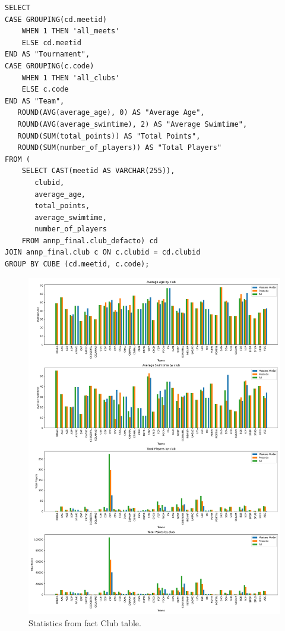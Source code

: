 \begin{verbatim}
SELECT 
CASE GROUPING(cd.meetid)
    WHEN 1 THEN 'all_meets'
    ELSE cd.meetid
END AS "Tournament",
CASE GROUPING(c.code)
    WHEN 1 THEN 'all_clubs'
    ELSE c.code
END AS "Team",
   ROUND(AVG(average_age), 0) AS "Average Age",
   ROUND(AVG(average_swimtime), 2) AS "Average Swimtime",
   ROUND(SUM(total_points)) AS "Total Points",
   ROUND(SUM(number_of_players)) AS "Total Players"
FROM (
    SELECT CAST(meetid AS VARCHAR(255)),
       clubid,
       average_age,
       total_points,
       average_swimtime,
       number_of_players
    FROM annp_final.club_defacto) cd
JOIN annp_final.club c ON c.clubid = cd.clubid
GROUP BY CUBE (cd.meetid, c.code);
\end{verbatim}


\begin{figure}[H]
    \centering
    \includegraphics[width=\textwidth]{img/club_fact1.pdf}
    \caption{Statistics from fact Club table.}
    \label{fig:clubs_fact}
\end{figure}

